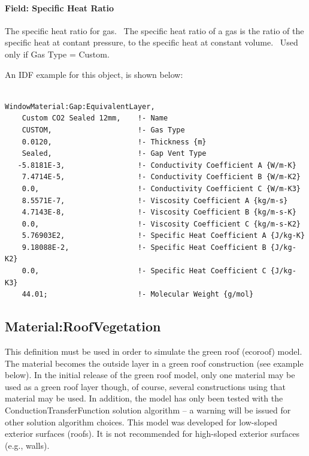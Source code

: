 \paragraph{Field: Specific Heat Ratio}\label{field-specific-heat-ratio-3}

The specific heat ratio for gas.~ The specific heat ratio of a gas is the ratio of the specific heat at contant pressure, to the specific heat at constant volume.~ Used only if Gas Type = Custom.

An IDF example for this object, is shown below:

\begin{lstlisting}

WindowMaterial:Gap:EquivalentLayer,
    Custom CO2 Sealed 12mm,    !- Name
    CUSTOM,                    !- Gas Type
    0.0120,                    !- Thickness {m}
    Sealed,                    !- Gap Vent Type
   -5.8181E-3,                 !- Conductivity Coefficient A {W/m-K}
    7.4714E-5,                 !- Conductivity Coefficient B {W/m-K2}
    0.0,                       !- Conductivity Coefficient C {W/m-K3}
    8.5571E-7,                 !- Viscosity Coefficient A {kg/m-s}
    4.7143E-8,                 !- Viscosity Coefficient B {kg/m-s-K}
    0.0,                       !- Viscosity Coefficient C {kg/m-s-K2}
    5.76903E2,                 !- Specific Heat Coefficient A {J/kg-K}
    9.18088E-2,                !- Specific Heat Coefficient B {J/kg-K2}
    0.0,                       !- Specific Heat Coefficient C {J/kg-K3}
    44.01;                     !- Molecular Weight {g/mol}
\end{lstlisting}

\subsection{Material:RoofVegetation}\label{materialroofvegetation}

This definition must be used in order to simulate the green roof (ecoroof) model. The material becomes the outside layer in a green roof construction (see example below). In the initial release of the green roof model, only one material may be used as a green roof layer though, of course, several constructions using that material may be used. In addition, the model has only been tested with the ConductionTransferFunction solution algorithm -- a warning will be issued for other solution algorithm choices. This model was developed for low-sloped exterior surfaces (roofs). It is not recommended for high-sloped exterior surfaces (e.g., walls).

